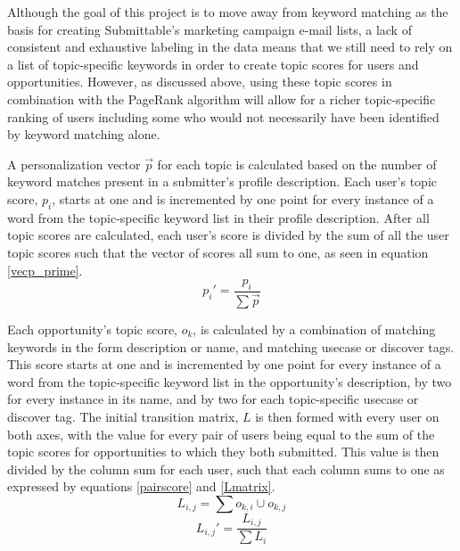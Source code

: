 \documentclass[]{report}   %
\begin{document}
Although the goal of this project is to move away from keyword matching as the basis for creating Submittable's marketing campaign e-mail lists, a lack of consistent and exhaustive labeling in the data means that we still need to rely on a list of topic-specific keywords in order to create topic scores for users and opportunities. However, as discussed above, using these topic scores in combination with the PageRank algorithm will allow for a richer topic-specific ranking of users including some who would not necessarily have been identified by keyword matching alone.

A personalization vector $\vec{p}$ for each topic is calculated based on the number of keyword matches present in a submitter's profile description. Each user's topic score, $p_{i}$, starts at one and is incremented by one point for every instance of a word from the topic-specific keyword list in their profile description. After all topic scores are calculated, each user's score is divided by the sum of all the user topic scores such that the vector of scores all sum to one, as seen in equation \ref{vecp_prime}.
\begin{equation}
\label{vecp_prime}
p_{i}'=\frac{p_i}{\sum{\vec{p}}}
\end{equation}

Each opportunity's topic score, $o_k$, is calculated by a combination of matching keywords in the form description or name, and matching usecase or discover tags. This score starts at one and is incremented by one point for every instance of a word from the topic-specific keyword list in the opportunity's description, by two for every instance in its name, and by two for each topic-specific usecase or discover tag. The initial transition matrix, $L$ is then formed with every user on both axes, with the value for every pair of users being equal to the sum of the topic scores for opportunities to which they both submitted. This value is then divided by the column sum for each user, such that each column sums to one as expressed by equations \ref{pairscore} and \ref{Lmatrix}.
\begin{equation}
\label{pairscore}
L_{i,j}=\sum{o_{k,i}\cup o_{k,j}}
\end{equation}
\begin{equation}
\label{Lmatrix}
L_{i,j}' =\frac{L_{i,j}}{\sum{L_i}}
\end{equation}
\end{document}
